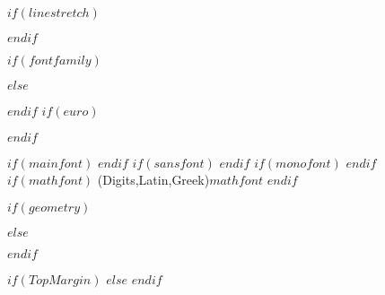 $if(linestretch)$
\usepackage{setspace}
$endif$
\usepackage{amssymb,amsmath}
\usepackage{ifxetex,ifluatex}
\usepackage{fixltx2e} %
{}\fi{} %
  \usepackage[T1]{fontenc}
  \usepackage[utf8]{inputenc}
$if(fontfamily)$
\usepackage{$fontfamily$}
$else$
\usepackage{mathptmx}
$endif$
$if(euro)$
  \usepackage{eurosym}
$endif$
\else %
  \ifxetex
    \usepackage{mathspec}
    \usepackage{xltxtra,xunicode}
  \else
    \usepackage{fontspec}
  \fi
  \newcommand{\euro}{€}
$if(mainfont)$
    \setmainfont{$mainfont$}
$endif$
$if(sansfont)$
    \setsansfont{$sansfont$}
$endif$
$if(monofont)$
    \setmonofont[Mapping=tex-ansi]{$monofont$}
$endif$
$if(mathfont)$
    \setmathfont(Digits,Latin,Greek){$mathfont$}
$endif$
\fi
\usepackage{graphicx}
\usepackage{epstopdf}
\usepackage{calc}
$if(geometry)$
\usepackage[$for(geometry)$$geometry$$sep$,$endfor$]{geometry}
$else$
\usepackage[left=1in,right=1in,top=1in,bottom=1in,heightrounded]{geometry}
$endif$


\setlength{\defaulttopmargin}{1in}
$if(TopMargin)$
\setlength{\defaulttopmargin}{$TopMargin$}
$else$
\setlength{\defaulttopmargin}{1in}
$endif$


